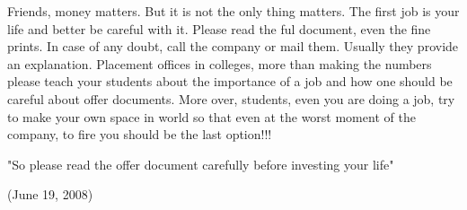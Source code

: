 Friends, money matters. But it is not the only thing matters. The first job is your life and better be careful with it. Please read the ful document, even the fine prints. In case of any doubt, call the company or mail them. Usually they provide an explanation. Placement offices in colleges, more than making the numbers please teach your students about the importance of a job and how one should be careful about offer documents. More over, students, even you are doing a job, try to make your own space in world so that even at the worst moment of the company, to fire you should be the last option!!!

"So please read the offer document carefully before investing your life"

(June 19, 2008)
\newpage
